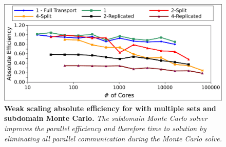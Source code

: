 \begin{figure}[t!]
  \begin{center}
    \includegraphics[width=6in]{chapters/parallel_mc/titan_weak_subdomain_ms.pdf}
  \end{center}
  \caption{\textbf{Weak scaling absolute efficiency for with
      multiple sets and subdomain Monte Carlo.} \textit{The subdomain
      Monte Carlo solver improves the parallel efficiency and
      therefore time to solution by eliminating all parallel
      communication during the Monte Carlo solve.}}
  \label{fig:titan_weak_subdomain_ms}
\end{figure}
